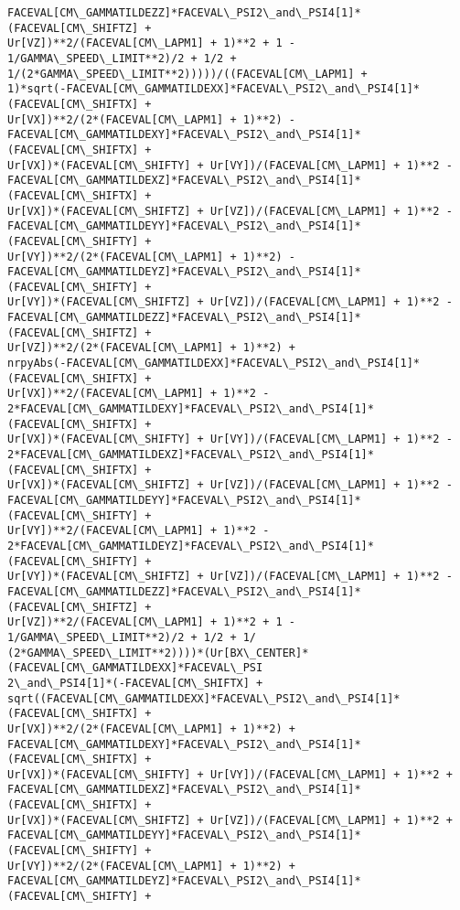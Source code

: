 \documentclass[landscape,letterpaper,10pt,english]{article}
\begin{document}
\begin{Verbatim}[commandchars=\\\{\}]
FACEVAL[CM\_GAMMATILDEZZ]*FACEVAL\_PSI2\_and\_PSI4[1]*(FACEVAL[CM\_SHIFTZ] +
Ur[VZ])**2/(FACEVAL[CM\_LAPM1] + 1)**2 + 1 - 1/GAMMA\_SPEED\_LIMIT**2)/2 + 1/2 +
1/(2*GAMMA\_SPEED\_LIMIT**2)))))/((FACEVAL[CM\_LAPM1] +
1)*sqrt(-FACEVAL[CM\_GAMMATILDEXX]*FACEVAL\_PSI2\_and\_PSI4[1]*(FACEVAL[CM\_SHIFTX] +
Ur[VX])**2/(2*(FACEVAL[CM\_LAPM1] + 1)**2) -
FACEVAL[CM\_GAMMATILDEXY]*FACEVAL\_PSI2\_and\_PSI4[1]*(FACEVAL[CM\_SHIFTX] +
Ur[VX])*(FACEVAL[CM\_SHIFTY] + Ur[VY])/(FACEVAL[CM\_LAPM1] + 1)**2 -
FACEVAL[CM\_GAMMATILDEXZ]*FACEVAL\_PSI2\_and\_PSI4[1]*(FACEVAL[CM\_SHIFTX] +
Ur[VX])*(FACEVAL[CM\_SHIFTZ] + Ur[VZ])/(FACEVAL[CM\_LAPM1] + 1)**2 -
FACEVAL[CM\_GAMMATILDEYY]*FACEVAL\_PSI2\_and\_PSI4[1]*(FACEVAL[CM\_SHIFTY] +
Ur[VY])**2/(2*(FACEVAL[CM\_LAPM1] + 1)**2) -
FACEVAL[CM\_GAMMATILDEYZ]*FACEVAL\_PSI2\_and\_PSI4[1]*(FACEVAL[CM\_SHIFTY] +
Ur[VY])*(FACEVAL[CM\_SHIFTZ] + Ur[VZ])/(FACEVAL[CM\_LAPM1] + 1)**2 -
FACEVAL[CM\_GAMMATILDEZZ]*FACEVAL\_PSI2\_and\_PSI4[1]*(FACEVAL[CM\_SHIFTZ] +
Ur[VZ])**2/(2*(FACEVAL[CM\_LAPM1] + 1)**2) +
nrpyAbs(-FACEVAL[CM\_GAMMATILDEXX]*FACEVAL\_PSI2\_and\_PSI4[1]*(FACEVAL[CM\_SHIFTX] +
Ur[VX])**2/(FACEVAL[CM\_LAPM1] + 1)**2 -
2*FACEVAL[CM\_GAMMATILDEXY]*FACEVAL\_PSI2\_and\_PSI4[1]*(FACEVAL[CM\_SHIFTX] +
Ur[VX])*(FACEVAL[CM\_SHIFTY] + Ur[VY])/(FACEVAL[CM\_LAPM1] + 1)**2 -
2*FACEVAL[CM\_GAMMATILDEXZ]*FACEVAL\_PSI2\_and\_PSI4[1]*(FACEVAL[CM\_SHIFTX] +
Ur[VX])*(FACEVAL[CM\_SHIFTZ] + Ur[VZ])/(FACEVAL[CM\_LAPM1] + 1)**2 -
FACEVAL[CM\_GAMMATILDEYY]*FACEVAL\_PSI2\_and\_PSI4[1]*(FACEVAL[CM\_SHIFTY] +
Ur[VY])**2/(FACEVAL[CM\_LAPM1] + 1)**2 -
2*FACEVAL[CM\_GAMMATILDEYZ]*FACEVAL\_PSI2\_and\_PSI4[1]*(FACEVAL[CM\_SHIFTY] +
Ur[VY])*(FACEVAL[CM\_SHIFTZ] + Ur[VZ])/(FACEVAL[CM\_LAPM1] + 1)**2 -
FACEVAL[CM\_GAMMATILDEZZ]*FACEVAL\_PSI2\_and\_PSI4[1]*(FACEVAL[CM\_SHIFTZ] +
Ur[VZ])**2/(FACEVAL[CM\_LAPM1] + 1)**2 + 1 - 1/GAMMA\_SPEED\_LIMIT**2)/2 + 1/2 + 1/
(2*GAMMA\_SPEED\_LIMIT**2))))*(Ur[BX\_CENTER]*(FACEVAL[CM\_GAMMATILDEXX]*FACEVAL\_PSI
2\_and\_PSI4[1]*(-FACEVAL[CM\_SHIFTX] +
sqrt((FACEVAL[CM\_GAMMATILDEXX]*FACEVAL\_PSI2\_and\_PSI4[1]*(FACEVAL[CM\_SHIFTX] +
Ur[VX])**2/(2*(FACEVAL[CM\_LAPM1] + 1)**2) +
FACEVAL[CM\_GAMMATILDEXY]*FACEVAL\_PSI2\_and\_PSI4[1]*(FACEVAL[CM\_SHIFTX] +
Ur[VX])*(FACEVAL[CM\_SHIFTY] + Ur[VY])/(FACEVAL[CM\_LAPM1] + 1)**2 +
FACEVAL[CM\_GAMMATILDEXZ]*FACEVAL\_PSI2\_and\_PSI4[1]*(FACEVAL[CM\_SHIFTX] +
Ur[VX])*(FACEVAL[CM\_SHIFTZ] + Ur[VZ])/(FACEVAL[CM\_LAPM1] + 1)**2 +
FACEVAL[CM\_GAMMATILDEYY]*FACEVAL\_PSI2\_and\_PSI4[1]*(FACEVAL[CM\_SHIFTY] +
Ur[VY])**2/(2*(FACEVAL[CM\_LAPM1] + 1)**2) +
FACEVAL[CM\_GAMMATILDEYZ]*FACEVAL\_PSI2\_and\_PSI4[1]*(FACEVAL[CM\_SHIFTY] +

\end{Verbatim}
\end{document}
